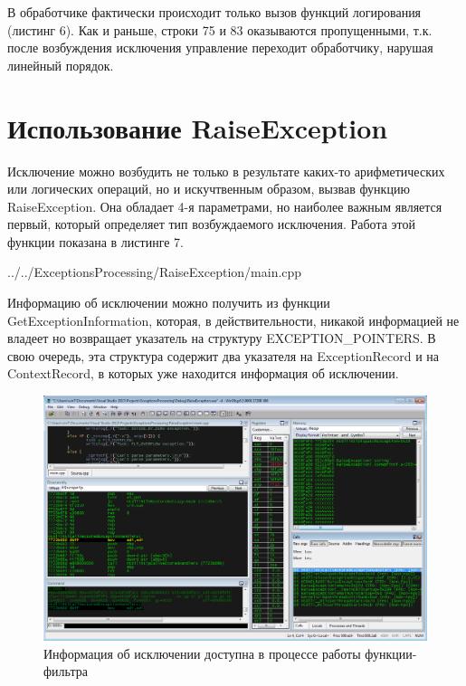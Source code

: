 \documentclass[a4paper, 12pt]{report}		%
\begin{document}
В обработчике фактически происходит только вызов функций логирования (листинг 6). Как и раньше, строки 75 и 83 оказываются пропущенными, т.к. после возбуждения исключения управление переходит обработчику, нарушая линейный порядок.




\chapter*{Использование RaiseException}

Исключение можно возбудить не только в результате каких-то арифметических или логических операций, но и искучтвенным образом, вызвав функцию RaiseException. Она обладает 4-я параметрами, но наиболее важным является первый, который определяет тип возбуждаемого исключения. Работа этой функции показана в листинге 7.


{../../ExceptionsProcessing/RaiseException/main.cpp}

Информацию об исключении можно получить из функции GetExceptionInformation, которая, в действительности, никакой информацией не владеет но возвращает указатель на структуру EXCEPTION\_POINTERS. В свою очередь, эта структура содержит два указателя на ExceptionRecord и на ContextRecord, в которых уже находится информация об исключении.

\begin{figure}[h!]
\centering
\includegraphics[scale=0.5]{res/005}
\caption{Информация об исключении доступна в процессе работы функции-фильтра}
\end{figure}
\end{document}
